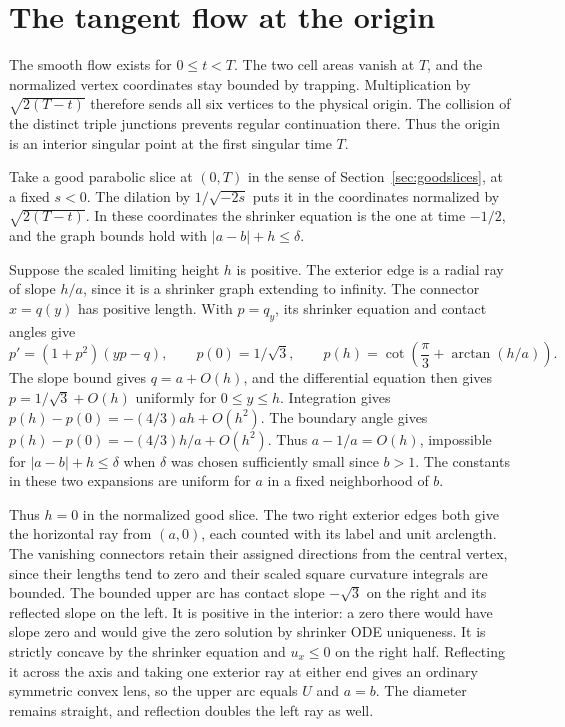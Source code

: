 \section{The tangent flow at the origin}\label{sec:tangent}

The smooth flow exists for \(0\le t<T\). The two cell areas vanish
at \(T\), and the normalized vertex coordinates stay bounded by
trapping. Multiplication by \(\sqrt{2(T-t)}\) therefore sends all six
vertices to the physical origin. The collision of the distinct
triple junctions prevents regular continuation there. Thus the
origin is an interior singular point at the first singular time \(T\).

Take a good parabolic slice at \((0,T)\) in the sense of
Section~\ref{sec:goodslices}, at a fixed \(s<0\). The dilation
by \(1/\sqrt{-2s}\) puts it in the coordinates normalized by
\(\sqrt{2(T-t)}\). In these coordinates the shrinker equation
is the one at time \(-1/2\), and the graph bounds hold with
\(|a-b|+h\le\delta\).

Suppose the scaled limiting height \(h\) is positive. The exterior
edge is a radial ray of slope \(h/a\), since it is a shrinker graph
extending to infinity. The connector \(x=q(y)\) has positive length.
With \(p=q_y\), its shrinker equation and contact angles give
\[
 p'=(1+p^2)(yp-q),\qquad p(0)=1/\sqrt3,\qquad
 p(h)=\cot\!\left(\frac{\pi}{3}+\arctan(h/a)\right).
\]
The slope bound gives \(q=a+O(h)\), and the differential equation
then gives \(p=1/\sqrt3+O(h)\) uniformly for \(0\le y\le h\).
Integration gives \(p(h)-p(0)=-(4/3)ah+O(h^2)\).
The boundary angle gives \(p(h)-p(0)=-(4/3)h/a+O(h^2)\).
Thus \(a-1/a=O(h)\), impossible for \(|a-b|+h\le\delta\) when
\(\delta\) was chosen sufficiently small since \(b>1\).
The constants in these two expansions are uniform for \(a\) in a
fixed neighborhood of \(b\).

Thus \(h=0\) in the normalized good slice. The two right exterior
edges both give the horizontal ray from \((a,0)\), each counted
with its label and unit arclength. The vanishing connectors retain
their assigned directions from the central vertex, since their
lengths tend to zero and their scaled square curvature integrals
are bounded. The bounded upper arc has contact slope \(-\sqrt3\)
on the right and its reflected slope on the left. It is positive
in the interior: a zero there would have slope zero and would give
the zero solution by shrinker ODE uniqueness. It is strictly concave
by the shrinker equation and \(u_x\le0\) on the right half. Reflecting
it across the axis and taking one exterior ray at either end gives an
ordinary symmetric convex lens, so the upper arc equals \(U\) and \(a=b\).
The diameter remains straight, and reflection doubles the left
ray as well.

